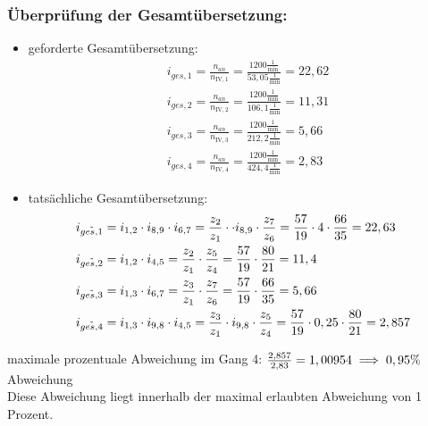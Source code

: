 \subsubsection{Überprüfung der Gesamtübersetzung:}
\begin{itemize}
\item geforderte Gesamtübersetzung:
\begin{align*}
	&i_{ges,1} = \frac{n_{an}}{n_{\mathrm{IV},1}} = \frac{1200 \frac{1}{\text{min}}}{53,05 \frac{1}{\text{min}}} = 22,62 \\
	&i_{ges,2} = \frac{n_{an}}{n_{\mathrm{IV},2}} = \frac{1200 \frac{1}{\text{min}}}{106,1 \frac{1}{\text{min}}} = 11,31 \\
	&i_{ges,3} = \frac{n_{an}}{n_{\mathrm{IV},3}} = \frac{1200 \frac{1}{\text{min}}}{212,2 \frac{1}{\text{min}}} = 5,66 \\
	&i_{ges,4} = \frac{n_{an}}{n_{\mathrm{IV},4}} = \frac{1200 \frac{1}{\text{min}}}{424,4 \frac{1}{\text{min}}} = 2,83
\end{align*}

\item tatsächliche Gesamtübersetzung:
	\begin{align*}
	&i_{\tilde{ges,1}} = i_{1,2} \cdot i_{8,9} \cdot i_{6,7} = \frac{z_2}{z_1} \cdot \cdot i_{8,9} \cdot \frac{z_{7}}{z_{6}} = \frac{57}{19} \cdot 4 \cdot \frac{66}{35}= 22,63 \\
	&i_{\tilde{ges,2}} = i_{1,2} \cdot i_{4,5} = \frac{z_2}{z_1} \cdot \frac{z_{5}}{z_{4}} = \frac{57}{19} \cdot \frac{80}{21} = 11,4 \\
	&i_{\tilde{ges,3}} = i_{1,3} \cdot i_{6,7} = \frac{z_3}{z_1} \cdot \frac{z_{7}}{z_{6}} = \frac{57}{19} \cdot \frac{66}{35} = 5,66\\
	&i_{\tilde{ges,4}} = i_{1,3} \cdot i_{9,8} \cdot i_{4,5} = \frac{z_3}{z_1} \cdot i_{9,8} \cdot \frac{z_{5}}{z_{4}} = \frac{57}{19} \cdot  0,25 \cdot \frac{80}{21} = 2,857
	\end{align*}
\end{itemize}
maximale prozentuale Abweichung im Gang 4: $\frac{2,857}{2,83} = 1,00954\\
\implies 0,95 \% $ Abweichung \\
Diese Abweichung liegt innerhalb der maximal erlaubten Abweichung von 1 Prozent.
\newpage
